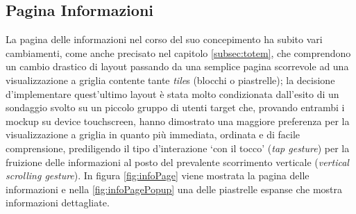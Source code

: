 \subsection{Pagina Informazioni}
La pagina delle informazioni nel corso del suo concepimento ha subito vari cambiamenti, come anche precisato nel capitolo \ref{subsec:totem}, che comprendono un cambio drastico di layout passando da una semplice pagina scorrevole ad una visualizzazione a griglia contente tante \textit{tile}s (blocchi o piastrelle); la decisione d'implementare quest'ultimo layout è stata molto condizionata dall'esito di un sondaggio svolto su un piccolo gruppo di utenti target che, provando entrambi i mockup su device touchscreen, hanno dimostrato una maggiore preferenza per la visualizzazione a griglia in quanto più immediata, ordinata e di facile comprensione, prediligendo il tipo d'interazione \enquote*{con il tocco} (\textit{tap gesture}) per la fruizione delle informazioni al posto del prevalente scorrimento verticale (\textit{vertical scrolling gesture}). In figura \ref{fig:infoPage} viene mostrata la pagina delle informazioni e nella \ref{fig:infoPagePopup} una delle piastrelle espanse che mostra informazioni dettagliate.

